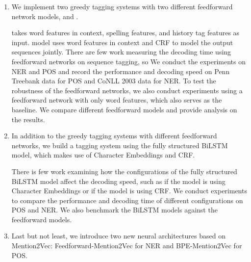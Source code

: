 \begin{enumerate}

\item We implement two greedy tagging systems with two different feedforward network models, \ffa{} and \ffb. 

\ffa{} takes word features in context, spelling features, and history tag features as input. \ffb model uses word features in context and CRF to model the output sequences jointly. There are few work measuring the decoding time using feedforward networks on sequence tagging, so We conduct the experiments on NER and POS and record the performance and decoding speed on Penn Treebank data for POS and CoNLL 2003 data for NER. To test the robustness of the feedforward networks, we also conduct experiments using a feedforward network with only word features, which also serves as the baseline. We compare different feedforward models and provide analysis on the results. 

\item In addition to the greedy tagging systems with different feedforward networks, we build a tagging system using the fully structured BiLSTM model, which makes use of Character Embeddings and CRF. 

There is few work examining how the configurations of the fully structured BiLSTM model affect the decoding speed, such as if the model is using Character Embeddings or if the model is using CRF. We conduct experiments to compare the performance and decoding time of different configurations on POS and NER. We also benchmark the BiLSTM models against the feedforward models.

\item Last but not least, we introduce two new neural architectures based on Mention2Vec: Feedforward-Mention2Vec for NER and BPE-Mention2Vec for POS. 


\end{enumerate}
